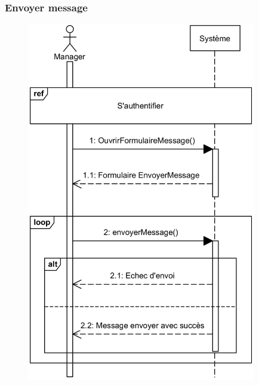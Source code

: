     \subsubsection[Envoyer message]{Envoyer message}
        \begin{figure}[H]
            \centering
            \includegraphics[width=100mm]{images/diagramme-de-sequence/sd-message.png}
            \label{fig:sdSendSms}
        \end{figure}